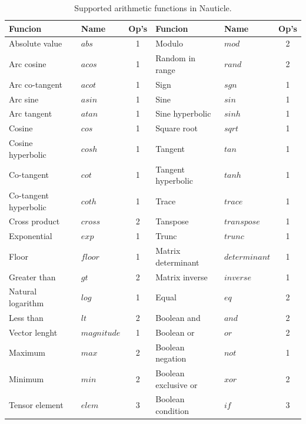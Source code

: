 \documentclass[a4paper,12pt,openany]{book}
\theoremstyle{break}
\begin{document}
\begin{table}
\begin{center}
\caption{Supported arithmetic functions in Nauticle.}\label{tbl:arfc}
\begin{tabular}{ l l c | l l c }
\toprule[1.5pt]
\bf Funcion & \bf Name & \bf Op's & \bf Funcion & \bf Name & \bf Op's\\ 
\midrule
Absolute value & $abs$ & 1 & Modulo & $mod$ & 2 \\
Arc cosine & $acos$ & 1 & Random in range & $rand$ & 2 \\
Arc co-tangent & $acot$ & 1 & Sign & $sgn$ & 1 \\
Arc sine & $asin$ & 1 & Sine & $sin$ & 1 \\
Arc tangent & $atan$ & 1 & Sine hyperbolic & $sinh$ & 1 \\
Cosine & $cos$ & 1 & Square root & $sqrt$ & 1 \\
Cosine hyperbolic & $cosh$ & 1 & Tangent & $tan$ & 1 \\
Co-tangent & $cot$ & 1 & Tangent hyperbolic & $tanh$ & 1 \\
Co-tangent hyperbolic & $coth$ & 1 & Trace & $trace$ & 1 \\
Cross product & $cross$ & 2 & Tanspose & $transpose$ & 1 \\
Exponential & $exp$ & 1 & Trunc & $trunc$ & 1 \\
Floor & $floor$ & 1 & Matrix determinant & $determinant$ & 1 \\
Greater than & $gt$ & 2 & Matrix inverse & $inverse$ & 1 \\
Natural logarithm & $log$ & 1 & Equal & $eq$ & 2 \\
Less than & $lt$ & 2 & Boolean and & $and$ & 2 \\
Vector lenght & $magnitude$ & 1 & Boolean or & $or$ & 2 \\
Maximum & $max$ & 2 & Boolean negation & $not$ & 1 \\
Minimum & $min$ & 2 & Boolean exclusive or & $xor$ & 2 \\
Tensor element & $elem$ & 3 & Boolean condition & $if$ & 3 \\
\bottomrule[1.25pt]
\end{tabular}
\end{center}
\end{table}
\end{document}
